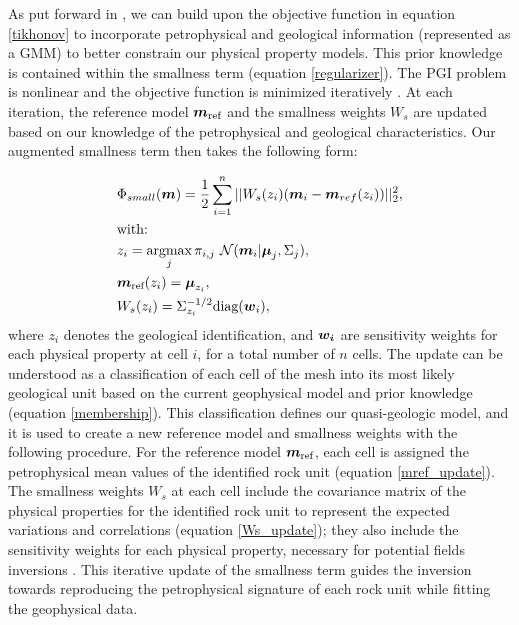 \documentclass[paper, twocolumn]{geophysics} %
\newcommand{\mathbf}[1]{
  \hbox{\mathversion{bold}$#1$}}
\begin{document}
As put forward in \citet{ggz389}, we can build upon the objective function in equation \ref{tikhonov} to incorporate petrophysical and geological information (represented as a GMM) to better constrain our physical property models. This prior knowledge is contained within the smallness term (equation \ref{regularizer}). The PGI problem is nonlinear and the objective function is minimized iteratively \citep{Tutorial}. At each iteration, the reference model $\mathbf{m}_{\text{ref}}$ and the smallness weights $W_{s}$ are updated based on our knowledge of the petrophysical and geological characteristics. Our augmented smallness term then takes the following form:

\begin{align}
&\Phi_{small}(\mathbf{m}) = \frac{1}{2}\sum_{i=1}^n||W_{s}(z_i)(\mathbf{m}_i-\mathbf{m}_{ref}(z_i))||_2^2, \label{smallness_petro}\\
&\text{with:}\nonumber\\
&z_i = \mathop{\hbox{argmax}}\limits_{j} \pi_{i,j}~\mathcal{N}(\mathbf{m}_i|\mathbf{\mu}_j, \Sigma_j), \label{membership} \\
&\mathbf{m}_{\text{ref}}(z_i) = \mathbf{\mu}_{z_i}, \label{mref_update}\\
&W_{s}(z_i) = \Sigma_{z_i}^{-1/2}\text{diag}(\mathbf{w}_{{i}}), \label{Ws_update}
\end{align}
where $z_i$ denotes the geological identification, and $\mathbf{w_i}$ are sensitivity weights for each physical property at cell $i$, for a total number of $n$ cells.
The update can be understood as a classification of each cell of the mesh into its most likely geological unit based on the current geophysical model and prior knowledge (equation \ref{membership}). This classification defines our quasi-geologic model, and it is used to create a new reference model and smallness weights with the following procedure. For the reference model $\mathbf{m}_{\text{ref}}$, each cell is assigned the petrophysical mean values of the identified rock unit (equation \ref{mref_update}). The smallness weights $W_{s}$ at each cell include the covariance matrix of the physical properties for the identified rock unit to represent the expected variations and correlations (equation \ref{Ws_update}); they also include the sensitivity weights for each physical property, necessary for potential fields inversions \citep{Li1996, Li1998, Li2001}. This iterative update of the smallness term guides the inversion towards reproducing the petrophysical signature of each rock unit while fitting the geophysical data.
\end{document}
